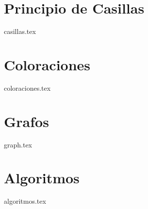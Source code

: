 \chapter{Principio de Casillas}
{casillas.tex}

\chapter{Coloraciones}
{coloraciones.tex}

\chapter{Grafos}
{graph.tex}

\chapter{Algoritmos}
{algoritmos.tex}